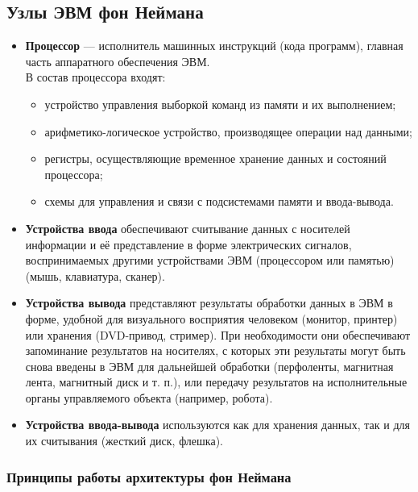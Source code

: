 \subsection{Узлы ЭВМ фон Неймана}\label{subsec:von-neumann-evm-nodes}
\begin{itemize}
    \item \textbf{Процессор} --- исполнитель машинных инструкций (кода программ), главная часть аппаратного обеспечения ЭВМ. \\
          В состав процессора входят:
          \begin{itemize}
              \item устройство управления выборкой команд из памяти и их выполнением;
              \item арифметико-логическое устройство, производящее операции над данными;
              \item регистры, осуществляющие временное хранение данных и состояний процессора;
              \item схемы для управления и связи с подсистемами памяти и ввода-вывода.
          \end{itemize}
    \item \textbf{Устройства ввода} обеспечивают считывание данных с носителей информации и её представление в форме электрических сигналов, воспринимаемых другими устройствами ЭВМ (процессором или памятью) (мышь, клавиатура, сканер).
    \item \textbf{Устройства вывода} представляют результаты обработки данных в ЭВМ в форме, удобной для визуального восприятия человеком (монитор, принтер) или хранения (DVD-привод, стример). При необходимости они обеспечивают запоминание результатов на носителях, с которых эти результаты могут быть снова введены в ЭВМ для дальнейшей обработки (перфоленты, магнитная лента, магнитный диск и т. п.), или передачу результатов на исполнительные органы управляемого объекта (например, робота).
    \item \textbf{Устройства ввода-вывода} используются как для хранения данных, так и для их считывания (жесткий диск, флешка).
\end{itemize}

\subsubsection{Принципы работы архитектуры фон Неймана}\label{subsubsec:von-neumann-evm-principles}

